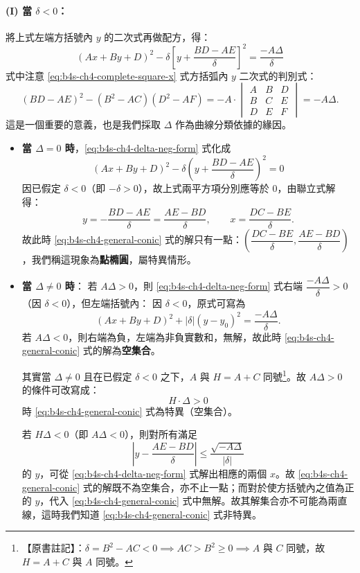 \paragraph*{(I) 當 $\delta < 0$：} 將上式左端方括號內 $y$ 的二次式再做配方，得：
\begin{equation}
(Ax + By + D)^2 - \delta \left[ y + \frac{BD - AE}{\delta} \right]^2 = \frac{-A\Delta}{\delta}
\label{eq:b4s-ch4-delta-neg-form}
\end{equation}
式中注意 \eqref{eq:b4s-ch4-complete-square-x} 式方括弧內 $y$ 二次式的判別式：
\[
(BD - AE)^2 - (B^2 - AC)(D^2 - AF) = -A \cdot \begin{vmatrix} A & B & D \\ B & C & E \\ D & E & F \end{vmatrix} = -A\Delta.
\]
這是一個重要的意義，也是我們採取 $\Delta$ 作為曲線分類依據的緣因。

\begin{itemize}
  \item[(i)] \textbf{當 $\Delta = 0$ 時}，\eqref{eq:b4s-ch4-delta-neg-form} 式化成
  \[
  (Ax + By + D)^2 - \delta \left( y + \frac{BD - AE}{\delta} \right)^2 = 0
  \]
  因已假定 $\delta < 0$（即 $-\delta > 0$），故上式兩平方項分別應等於 0，由聯立式解得：
  \[
  y = -\frac{BD - AE}{\delta} = \frac{AE - BD}{\delta}, \qquad
  x = \frac{DC - BE}{\delta}.
  \]
  故此時 \eqref{eq:b4s-ch4-general-conic} 式的解只有一點：$\left(\dfrac{DC - BE}{\delta}, \dfrac{AE - BD}{\delta}\right)$，我們稱這現象為\textbf{點橢圓}，屬特異情形。

  \item[(ii)] \textbf{當 $\Delta \ne 0$ 時}：
  若 $A\Delta > 0$，則 \eqref{eq:b4s-ch4-delta-neg-form} 式右端 $\dfrac{-A\Delta}{\delta} > 0$（因 $\delta < 0$），但左端括號內：
  因 $\delta < 0$，原式可寫為
  \[
  (Ax + By + D)^2 + |\delta|\left( y - y_0 \right)^2 = \frac{-A\Delta}{\delta}.
  \]
  若 $A\Delta < 0$，則右端為負，左端為非負實數和，無解，故此時 \eqref{eq:b4s-ch4-general-conic} 式的解為\textbf{空集合}。
  
  其實當 $\Delta \ne 0$ 且在已假定 $\delta < 0$ 之下，$A$ 與 $H = A + C$ 同號\label{note:b4s-ch4-same-sign}\footnote{【原書註記】：$\delta = B^2 - AC < 0 \implies AC > B^2 \ge 0 \implies A$ 與 $C$ 同號，故 $H = A + C$ 與 $A$ 同號。}。故 $A\Delta > 0$ 的條件可改寫成：
  \[
  H \cdot \Delta > 0
  \]
  時 \eqref{eq:b4s-ch4-general-conic} 式為特異（空集合）。
  
  若 $H\Delta < 0$（即 $A\Delta < 0$），則對所有滿足
  \begin{equation}
  \left| y - \frac{AE - BD}{\delta} \right| \le \frac{\sqrt{-A\Delta}}{|\delta|}
  \label{eq:b4s-ch4-ellipse-band}
  \end{equation}
  的 $y$，可從 \eqref{eq:b4s-ch4-delta-neg-form} 式解出相應的兩個 $x$。故 \eqref{eq:b4s-ch4-general-conic} 式的解既不為空集合，亦不止一點；而對於使方括號內之值為正的 $y$，代入 \eqref{eq:b4s-ch4-general-conic} 式中無解。故其解集合亦不可能為兩直線，這時我們知道 \eqref{eq:b4s-ch4-general-conic} 式非特異。
\end{itemize}

